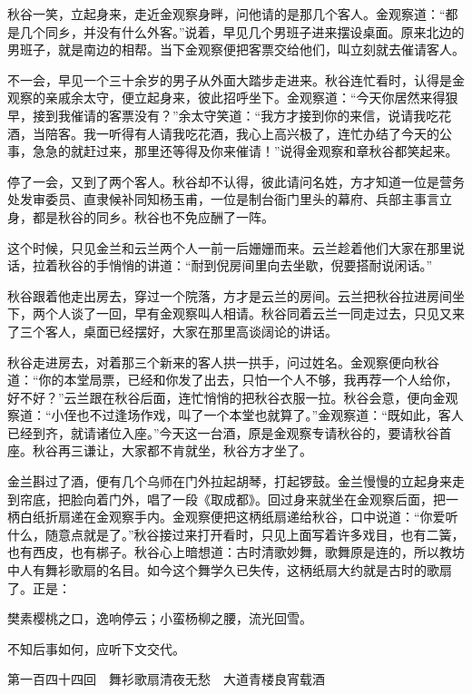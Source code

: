\documentclass[12pt,UTF8]{ctexbook}
\begin{document}
{{{秋谷一笑，立起身来，走近金观察身畔，问他请的是那几个客人。金观察道：“都是几个同乡，并没有什么外客。”说着，早见几个男班子进来摆设桌面。原来北边的男班子，就是南边的相帮。当下金观察便把客票交给他们，叫立刻就去催请客人。

不一会，早见一个三十余岁的男子从外面大踏步走进来。秋谷连忙看时，认得是金观察的亲戚余太守，便立起身来，彼此招呼坐下。金观察道：“今天你居然来得狠早，接到我催请的客票没有？”余太守笑道：“我方才接到你的来信，说请我吃花酒，当陪客。我一听得有人请我吃花酒，我心上高兴极了，连忙办结了今天的公事，急急的就赶过来，那里还等得及你来催请！”说得金观察和章秋谷都笑起来。

停了一会，又到了两个客人。秋谷却不认得，彼此请问名姓，方才知道一位是营务处发审委员、直隶候补同知杨玉甫，一位是制台衙门里头的幕府、兵部主事言立身，都是秋谷的同乡。秋谷也不免应酬了一阵。

这个时候，只见金兰和云兰两个人一前一后姗姗而来。云兰趁着他们大家在那里说话，拉着秋谷的手悄悄的讲道：“耐到倪房间里向去坐歇，倪要搭耐说闲话。”

秋谷跟着他走出房去，穿过一个院落，方才是云兰的房间。云兰把秋谷拉进房间坐下，两个人谈了一回，早有金观察叫人相请。秋谷同着云兰一同走过去，只见又来了三个客人，桌面已经摆好，大家在那里高谈阔论的讲话。

秋谷走进房去，对着那三个新来的客人拱一拱手，问过姓名。金观察便向秋谷道：“你的本堂局票，已经和你发了出去，只怕一个人不够，我再荐一个人给你，好不好？”云兰跟在秋谷后面，连忙悄悄的把秋谷衣服一拉。秋谷会意，便向金观察道：“小侄也不过逢场作戏，叫了一个本堂也就算了。”金观察道：“既如此，客人已经到齐，就请诸位入座。”今天这一台酒，原是金观察专请秋谷的，要请秋谷首座。秋谷再三谦让，大家都不肯就坐，秋谷方才坐了。

金兰斟过了酒，便有几个乌师在门外拉起胡琴，打起锣鼓。金兰慢慢的立起身来走到帘底，把脸向着门外，唱了一段《取成都》。回过身来就坐在金观察后面，把一柄白纸折扇递在金观察手内。金观察便把这柄纸扇递给秋谷，口中说道：“你爱听什么，随意点就是了。”秋谷接过来打开看时，只见上面写着许多戏目，也有二簧，也有西皮，也有梆子。秋谷心上暗想道：古时清歌妙舞，歌舞原是连的，所以教坊中人有舞衫歌扇的名目。如今这个舞学久已失传，这柄纸扇大约就是古时的歌扇了。正是：

樊素樱桃之口，逸响停云；小蛮杨柳之腰，流光回雪。

不知后事如何，应听下文交代。





第一百四十四回　舞衫歌扇清夜无愁　大道青楼良宵载酒





}}}
\end{document}

